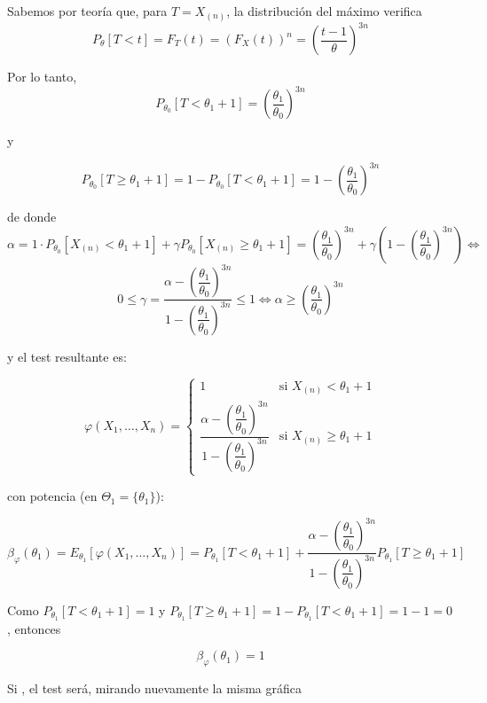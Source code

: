 \documentclass[12pt]{article}
\begin{document}
\begin{ejercicio}[2 puntos]
        Sabemos por teoría que, para $T = X_{(n)}$, la distribución del máximo verifica $$P_{\theta}[T<t] = F_T(t) = (F_X(t))^n = \left( \dfrac{t-1}{\theta} \right)^{3n}$$

        Por lo tanto, $$P_{\theta_0}[T < \theta_1 + 1] = \left( \dfrac{\theta_1}{\theta_0} \right)^{3n}$$

        y

        $$P_{\theta_0}[T \geq \theta_1 + 1] = 1 - P_{\theta_0}[T < \theta_1 + 1] = 1 - \left( \dfrac{\theta_1}{\theta_0} \right)^{3n}$$

        de donde
        $$\alpha = 1 \cdot P_{\theta_0}[X_{(n)} < \theta_1 + 1] + 
        \gamma P_{\theta_0}[X_{(n)} \geq \theta_1 + 1] = \left( \dfrac{\theta_1}{\theta_0} \right)^{3n} + \gamma \left( 1 - \left( \dfrac{\theta_1}{\theta_0} \right)^{3n} \right) \iff $$
        $$0 \leq \gamma = \dfrac{\alpha - \left( \dfrac{\theta_1}{\theta_0} \right)^{3n}}{1 - \left( \dfrac{\theta_1}{\theta_0} \right)^{3n}} \leq 1 \iff \alpha \geq \left( \dfrac{\theta_1}{\theta_0} \right)^{3n}$$

        y el test resultante es:

        $$\varphi(X_1, \ldots, X_n) = 
            \begin{cases}
                1 &\text{si } X_{(n)} < \theta_1 + 1 \\
                \dfrac{\alpha - \left( \dfrac{\theta_1}{\theta_0} \right)^{3n}}{1 - \left( \dfrac{\theta_1}{\theta_0} \right)^{3n}} &\text{si } X_{(n)} \geq \theta_1 + 1
            \end{cases}$$      
            
        con potencia (en $\Theta_1 = \{\theta_1\}$):

        $$\beta_{\varphi}(\theta_1) = E_{\theta_1}[\varphi(X_1, \ldots, X_n)] = P_{\theta_1}[T < \theta_1 + 1] + 
        \dfrac{\alpha - \left( \dfrac{\theta_1}{\theta_0} \right)^{3n}}{1 - \left( \dfrac{\theta_1}{\theta_0} \right)^{3n}} P_{\theta_1}[T \geq \theta_1 + 1]$$

        Como $P_{\theta_1}[T < \theta_1 + 1] = 1$ y $P_{\theta_1}[T \geq \theta_1 + 1] = 1 - P_{\theta_1}[T < \theta_1 + 1] = 1 - 1 = 0$, entonces

        $$\beta_{\varphi}(\theta_1) = 1$$

        \newpage

        Si , el test será, mirando nuevamente la misma gráfica

        \begin{figure}[H]
            \centering
\end{figure}
\end{ejercicio}
\end{document}
